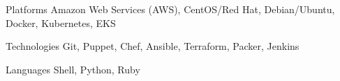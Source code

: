 \begin{cvskills}

\cvskill
    {Platforms}
    {Amazon Web Services (AWS), CentOS/Red Hat, Debian/Ubuntu, Docker, Kubernetes, EKS}

\cvskill
    {Technologies}
    {Git, Puppet, Chef, Ansible, Terraform, Packer, Jenkins}

\cvskill
    {Languages}
    {Shell, Python, Ruby}

\end{cvskills}